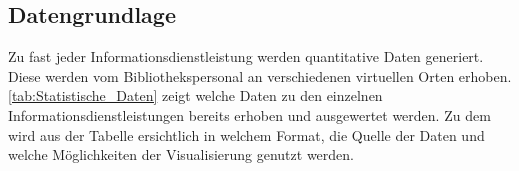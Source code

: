 \subsection{Datengrundlage}

Zu fast jeder Informationsdienstleistung werden quantitative Daten generiert. Diese werden vom Bibliothekspersonal
an verschiedenen virtuellen Orten erhoben. \autoref{tab:Statistische_Daten} zeigt welche Daten zu den einzelnen 
Informationsdienstleistungen bereits erhoben und ausgewertet werden. Zu dem wird aus der Tabelle ersichtlich in welchem Format, 
die Quelle der Daten und welche Möglichkeiten der Visualisierung genutzt werden.




